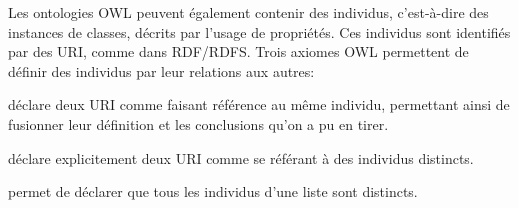 Les ontologies OWL peuvent également contenir des individus, c'est-à-dire des instances de classes, décrits par l'usage de propriétés.
Ces individus sont identifiés par des URI, comme dans RDF/RDFS. 
Trois axiomes OWL permettent de définir des individus par leur relations aux autres: 
\begin{liste}
  \item {} déclare deux URI comme faisant référence au même individu, permettant ainsi de fusionner leur définition et les conclusions qu'on a pu en tirer.
  \item {} déclare explicitement deux URI comme se référant à des individus distincts.
  \item {} permet de déclarer que tous les individus d'une liste sont distincts.
\end{liste}


 




